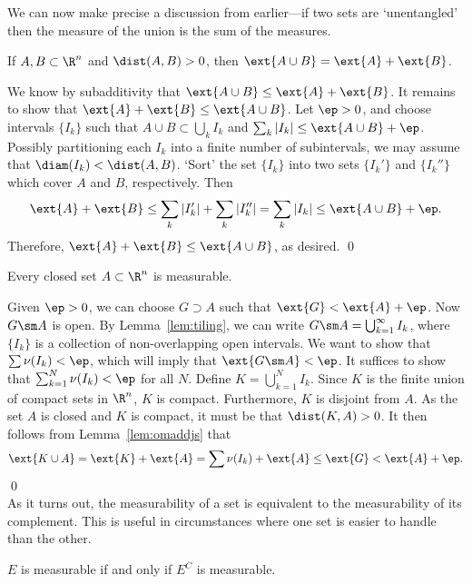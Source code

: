 	
We can now make precise a discussion from earlier---if two sets are `unentangled' then the measure of the union is the sum of the measures. 


\begin{lem} \label{lem:omaddjs}
If $A, B \subset \R^n$ and $\dist(A,B)>0$, then $\ext{A \cup B}= \ext{A}+\ext{B}$. 
\end{lem}

\pf We know by subadditivity that $\ext{A \cup B} \leq \ext{A}+\ext{B}$. It remains to show that $\ext{A}+\ext{B} \leq \ext{A \cup B}$. Let $\ep>0$, and choose intervals $\{I_k\}$ such that $A \cup B \subset \bigcup_k I_k$ and $\sum_k |I_k| \leq \ext{A \cup B} + \ep$. Possibly partitioning each $I_k$ into a finite number of subintervals, we may assume that $\diam(I_k)<\dist(A,B)$. `Sort' the set $\{I_k\}$ into two sets $\{I_k'\}$ and $\{I_k''\}$ which cover $A$ and $B$, respectively. Then
	\[
	\ext{A}+\ext{B} \leq \sum_k |I_k'| + \sum_k |I_k''| = \sum_k |I_k| \leq \ext{A \cup B} + \ep.
	\]
Therefore, $\ext{A} + \ext{B} \leq \ext{A \cup B}$, as desired. \qed \\




\begin{thm} \label{thm:closedmeas}
Every closed set $A \subset \R^n$ is measurable. 
\end{thm}

\pf Given $\ep>0$, we can choose $G \supset A$ such that $\ext{G}<\ext{A}+\ep$. Now $G \sm A$ is open. By Lemma~\ref{lem:tiling}, we can write $G\sm A=\bigcup_{k=1}^\infty I_k$, where $\{I_k\}$ is a collection of non-overlapping open intervals. We want to show that $\sum \nu(I_k)<\ep$, which will imply that $\ext{G \sm A}<\ep$. It suffices to show that $\sum_{k=1}^N \nu(I_k)<\ep$ for all $N$. Define $K= \bigcup_{k=1}^N I_k$. Since $K$ is the finite union of compact sets in $\R^n$, $K$ is compact. Furthermore, $K$ is disjoint from $A$. As the set $A$ is closed and $K$ is compact, it must be that $\dist(K,A)>0$. It then follows from Lemma~\ref{lem:omaddjs} that
	\[
	\ext{K \cup A}=\ext{K}+\ext{A}= \sum \nu(I_k) + \ext{A} \leq \ext{G} < \ext{A} + \ep.
	\] \qed \\


As it turns out, the measurability of a set is equivalent to the measurability of its complement. This is useful in circumstances where one set is easier to handle than the other.


\begin{thm} \label{thm:complementmeas}
$E$ is measurable if and only if $E^C$ is measurable.
\end{thm}

